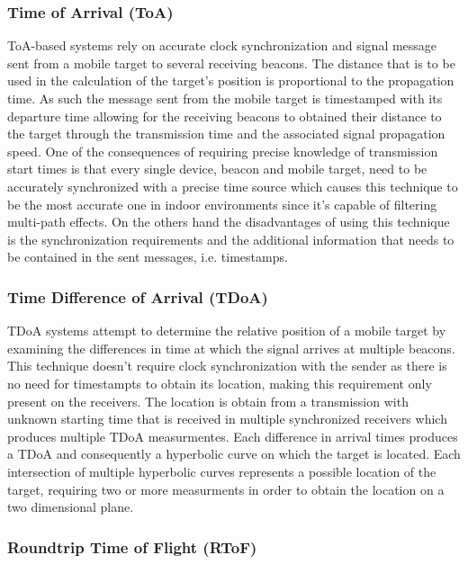 \subsubsection{Time of Arrival (ToA) }
\label{subsubsec:toa}

\ac{ToA}-based systems rely on accurate clock synchronization and signal message sent from a mobile target to several receiving beacons. The distance that is to be used in the calculation of the target's position is proportional to the propagation time. As such the message sent from the mobile target is timestamped with its departure time allowing for the receiving beacons to obtained their distance to the target through the transmission time and the associated signal propagation speed.
One of the consequences of requiring precise knowledge of transmission start times is that every single device, beacon and mobile target, need to be accurately synchronized with a precise time source which causes this technique to be the most accurate one in indoor environments since it's capable of filtering multi-path effects. On the others hand the disadvantages of using this technique is the synchronization requirements and the additional information that needs to be contained in the sent messages, i.e. timestamps. 


\subsubsection{Time Difference of Arrival (TDoA) }
\label{subsubsec:tdoa}

\ac{TDoA} systems attempt to determine the relative position of a mobile target by examining the differences in time at which the signal arrives at multiple beacons. This technique doesn't require clock synchronization with the sender as there is no need for timestampts to obtain its location, making this requirement only present on the receivers. The location is obtain from a transmission with unknown starting time that is received in multiple synchronized receivers which produces multiple \ac{TDoA} measurmentes. Each difference in arrival times produces a \ac{TDoA} and consequently a hyperbolic curve on which the target is located. Each intersection of multiple hyperbolic curves represents a possible location of the target, requiring two or more measurments in order to obtain the location on a two dimensional plane.


\subsubsection{Roundtrip Time of Flight (RToF)}
\label{subsubsec:rtfo}

